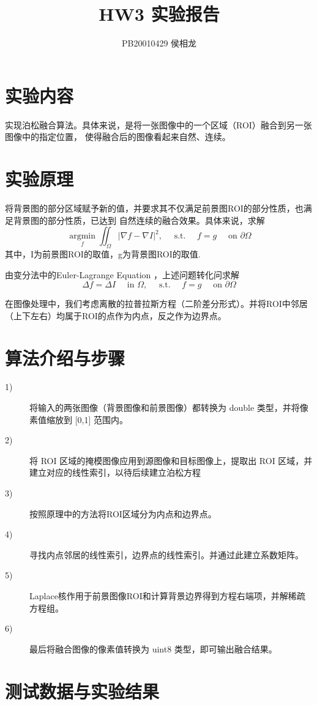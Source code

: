 \documentclass{article}
\title{HW3 实验报告}
\author{PB20010429 侯相龙}
\begin{document}
\maketitle
\section{实验内容}
实现泊松融合算法。具体来说，是将一张图像中的一个区域（ROI）融合到另一张图像中的指定位置，
使得融合后的图像看起来自然、连续。

\section{实验原理}

将背景图的部分区域赋予新的值，并要求其不仅满足前景图ROI的部分性质，也满足背景图的部分性质，已达到
自然连续的融合效果。具体来说，求解
\[\underset{f}{\operatorname{argmin}} \iint_{\Omega}|\nabla f-\nabla I|^{2}, \quad \text { s.t. } \quad f=g \quad \text { on } \partial \Omega\]
其中，I为前景图ROI的取值，g为背景图ROI的取值.

由变分法中的Euler-Lagrange Equation ，上述问题转化问求解
\[\Delta f=\Delta I \quad \text { in } \Omega, \quad \text { s.t. } \quad f=g \quad \text { on } \partial \Omega\]

在图像处理中，我们考虑离散的拉普拉斯方程（二阶差分形式）。并将ROI中邻居（上下左右）均属于ROI的点作为内点，反之作为边界点。
\section{算法介绍与步骤}
\begin{description}
    \item[1)]将输入的两张图像（背景图像和前景图像）都转换为 double 类型，并将像素值缩放到 [0,1] 范围内。
    \item[2)]将 ROI 区域的掩模图像应用到源图像和目标图像上，提取出 ROI 区域，并建立对应的线性索引，以待后续建立泊松方程
    \item[3)]按照原理中的方法将ROI区域分为内点和边界点。
    \item[4)]寻找内点邻居的线性索引，边界点的线性索引。并通过此建立系数矩阵。
    \item[5)]Laplace核作用于前景图像ROI和计算背景边界得到方程右端项，并解稀疏方程组。
    \item[6)] 最后将融合图像的像素值转换为 uint8 类型，即可输出融合结果。
\end{description}


\section{测试数据与实验结果}
\end{document}

